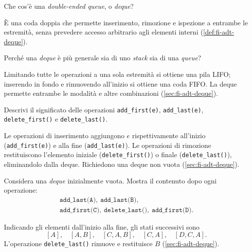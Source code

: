 \begin{exercise}
\label{ex:fi-esercizi-strutture-dati-deque-definizione}
Che cos'è una \emph{double-ended queue}, o \emph{deque}?
\end{exercise}

È una coda doppia che permette inserimento, rimozione e ispezione a entrambe le
estremità, senza prevedere accesso arbitrario agli elementi interni
(\cref{def:fi-adt-deque}).

\begin{exercise}
\label{ex:fi-esercizi-strutture-dati-deque-generalizza}
Perché una \emph{deque} è più generale sia di uno \emph{stack} sia di una
\emph{queue}?
\end{exercise}

Limitando tutte le operazioni a una sola estremità si ottiene una pila LIFO;
inserendo in fondo e rimuovendo all'inizio si ottiene una coda FIFO. La deque
permette entrambe le modalità e altre combinazioni (\cref{sec:fi-adt-deque}).

\begin{exercise}
\label{ex:fi-esercizi-strutture-dati-deque-operazioni}
Descrivi il significato delle operazioni \texttt{add\_first(e)},
\texttt{add\_last(e)}, \texttt{delete\_first()} e \texttt{delete\_last()}.
\end{exercise}

Le operazioni di inserimento aggiungono \(e\) rispettivamente all'inizio
(\texttt{add\_first(e)}) e alla fine (\texttt{add\_last(e)}).
Le operazioni di rimozione restituiscono l'elemento iniziale
(\texttt{delete\_first()}) o finale (\texttt{delete\_last()}), eliminandolo
dalla deque. Richiedono una deque non vuota (\cref{sec:fi-adt-deque}).

\clearpage

\begin{exercise}
\label{ex:fi-esercizi-strutture-dati-deque-traccia}
Considera una \emph{deque} inizialmente vuota. Mostra il contenuto dopo ogni
operazione:
\[
\begin{gathered}
  \texttt{add\_last(A)},\ \texttt{add\_last(B)},\\
  \texttt{add\_first(C)},\ \texttt{delete\_last()},\ \texttt{add\_first(D)}.
\end{gathered}
\]
\end{exercise}

Indicando gli elementi dall'inizio alla fine, gli stati successivi sono
\[
  [A],\quad [A,B],\quad [C,A,B],\quad [C,A],\quad [D,C,A].
\]
L'operazione \texttt{delete\_last()} rimuove e restituisce \(B\)
(\cref{sec:fi-adt-deque}).

